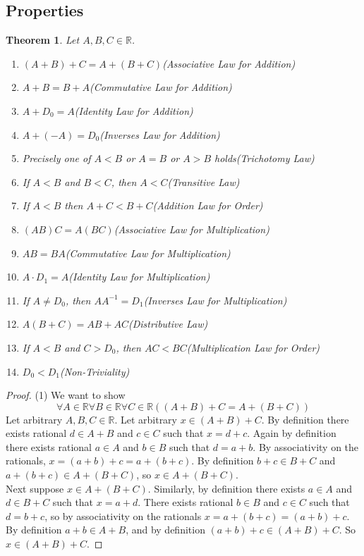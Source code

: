 \documentclass{report}
\newtheorem{theorem}[theo]{Theorem}
\begin{document}
\subsection{Properties}
\begin{theorem} Let $A,B,C\in\mathbb R$.
\begin{enumerate}
\item$(A+B)+C=A+(B+C)$\quad(Associative Law for Addition)
\item$A+B=B+A$\quad(Commutative Law for Addition)
\item$A+D_0=A$\quad(Identity Law for Addition)
\item$A+(-A)=D_0$\quad(Inverses Law for Addition)
\item Precisely one of $A<B$ or $A=B$ or $A>B$ holds\quad(Trichotomy Law)
\item If $A<B$ and $B<C$, then $A<C$\quad(Transitive Law)
\item If $A<B$ then $A+C<B+C$\quad(Addition Law for Order)
\item$(AB)C=A(BC)$\quad(Associative Law for Multiplication)
\item$AB=BA$\quad(Commutative Law for Multiplication)
\item$A\cdot D_1=A$\quad(Identity Law for Multiplication)
\item If $A\neq D_0$, then $AA^{-1}=D_1$\quad(Inverses Law for Multiplication)
\item$A(B+C)=AB+AC$\quad(Distributive Law)
\item If $A<B$ and $C>D_0$, then $AC<BC$\quad(Multiplication Law for Order)
\item $D_0<D_1$\quad(Non-Triviality)
\end{enumerate}
\end{theorem}
\begin{proof}(1)
We want to show
\begin{equation*}
\forall A\in\mathbb R\forall B\in\mathbb R\forall C\in\mathbb R((A+B)+C=A+(B+C))
\end{equation*}
Let arbitrary $A,B,C\in\mathbb R$. Let arbitrary $x\in(A+B)+C$. By definition there exists rational $d\in A+B$ and $c\in C$ such that $x=d+c$.
Again by definition there exists rational $a\in A$ and $b\in B$ such that $d=a+b$. By associativity on the rationals, $x=(a+b)+c=a+(b+c)$.
By definition $b+c\in B+C$ and $a+(b+c)\in A+(B+C)$, so $x\in A+(B+C)$.\\
\indent Next suppose $x\in A+(B+C)$. Similarly, by definition there exists $a\in A$ and $d\in B+C$ such that $x=a+d$. 
There exists rational $b\in B$ and $c\in C$ such that $d=b+c$, so by associativity on the rationals $x=a+(b+c)=(a+b)+c$. By definition $a+b\in A+B$,
and by definition $(a+b)+c\in(A+B)+C$. So $x\in(A+B)+C$.
\end{proof}
\end{document}
